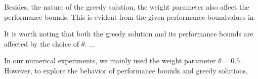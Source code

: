 \documentclass[letterpaper, 10 pt, conference]{ieeeconf}
\begin{document}
Besides, the nature of the greedy solution, the weight parameter also affect the performance bounds. This is evident from the given performance boundvalues in        

It is worth noting that both the greedy solution and its performance bounds are affected by the choice of $\theta$. ...



In our numerical experiments, we mainly used the weight parameter $\theta=0.5$. However, to explore the behavior of performance bounds and greedy solutions,  
















\end{document}
